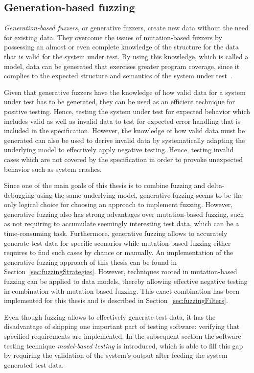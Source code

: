 \subsection{Generation-based fuzzing}
\label{subsec:generationFuzzing}

\emph{Generation-based fuzzers}, or generative fuzzers, create new data without the need for existing data. They overcome the issues of mutation-based fuzzers by possessing an almost or even complete knowledge of the structure for the data that is valid for the system under test. By using this knowledge, which is called a model, data can be generated that exercises greater program coverage, since it complies to the expected structure and semantics of the system under test~\cite{miller2007analysis}.

Given that generative fuzzers have the knowledge of how valid data for a system under test has to be generated, they can be used as an efficient technique for positive testing. Hence, testing the system under test for expected behavior which includes valid as well as invalid data to test for expected error handling that is included in the specification. However, the knowledge of how valid data must be generated can also be used to derive invalid data by systematically adapting the underlying model to effectively apply negative testing. Hence, testing invalid cases which are not covered by the specification in order to provoke unexpected behavior such as system crashes.

Since one of the main goals of this thesis is to combine fuzzing and delta-debugging using the same underlying model, generative fuzzing seems to be the only logical choice for choosing an approach to implement fuzzing. However, generative fuzzing also has strong advantages over mutation-based fuzzing, such as not requiring to accumulate seemingly interesting test data, which can be a time-consuming task. Furthermore, generative fuzzing allows to accurately generate test data for specific scenarios while mutation-based fuzzing either requires to find such cases by chance or manually. An implementation of the generative fuzzing approach of this thesis can be found in Section~\ref{sec:fuzzingStrategies}. However, techniques rooted in mutation-based fuzzing can be applied to data models, thereby allowing effective negative testing in combination with mutation-based fuzzing. This exact combination has been implemented for this thesis and is described in Section~\ref{sec:fuzzingFilters}.

Even though fuzzing allows to effectively generate test data, it has the disadvantage of skipping one important part of testing software: verifying that specified requirements are implemented. In the subsequent section the software testing technique \emph{model-based testing} is introduced, which is able to fill this gap by requiring the validation of the system's output after feeding the system generated test data.


